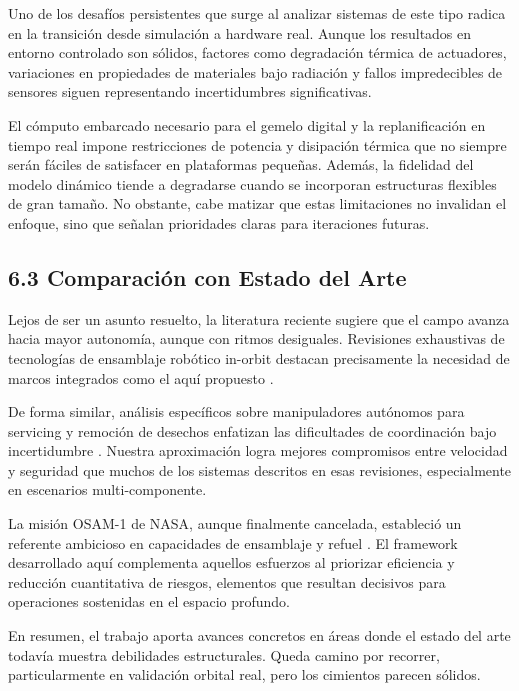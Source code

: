 Uno de los desafíos persistentes que surge al analizar sistemas de este tipo radica en la transición desde simulación a hardware real. Aunque los resultados en entorno controlado son sólidos, factores como degradación térmica de actuadores, variaciones en propiedades de materiales bajo radiación y fallos impredecibles de sensores siguen representando incertidumbres significativas.

El cómputo embarcado necesario para el gemelo digital y la replanificación en tiempo real impone restricciones de potencia y disipación térmica que no siempre serán fáciles de satisfacer en plataformas pequeñas. Además, la fidelidad del modelo dinámico tiende a degradarse cuando se incorporan estructuras flexibles de gran tamaño. No obstante, cabe matizar que estas limitaciones no invalidan el enfoque, sino que señalan prioridades claras para iteraciones futuras.

\subsection{6.3 Comparación con Estado del Arte}

Lejos de ser un asunto resuelto, la literatura reciente sugiere que el campo avanza hacia mayor autonomía, aunque con ritmos desiguales. Revisiones exhaustivas de tecnologías de ensamblaje robótico in-orbit destacan precisamente la necesidad de marcos integrados como el aquí propuesto \cite{Wang2025_OASR}. 

De forma similar, análisis específicos sobre manipuladores autónomos para servicing y remoción de desechos enfatizan las dificultades de coordinación bajo incertidumbre \cite{Fallahiarezoodar2025_Manipulators}. Nuestra aproximación logra mejores compromisos entre velocidad y seguridad que muchos de los sistemas descritos en esas revisiones, especialmente en escenarios multi-componente.

La misión OSAM-1 de NASA, aunque finalmente cancelada, estableció un referente ambicioso en capacidades de ensamblaje y refuel \cite{NASA_OSAM1_2023}. El framework desarrollado aquí complementa aquellos esfuerzos al priorizar eficiencia y reducción cuantitativa de riesgos, elementos que resultan decisivos para operaciones sostenidas en el espacio profundo. 

En resumen, el trabajo aporta avances concretos en áreas donde el estado del arte todavía muestra debilidades estructurales. Queda camino por recorrer, particularmente en validación orbital real, pero los cimientos parecen sólidos.